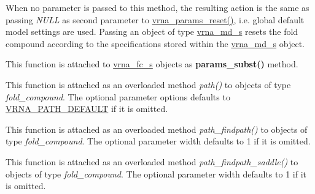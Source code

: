 \begin{DoxyRefList}
When no parameter is passed to this method, the resulting action is the same as passing {\itshape N\+U\+LL} as second parameter to \hyperlink{group__energy__parameters_gac40dc82e48a72a97cfc58b9da08a7792}{vrna\+\_\+params\+\_\+reset()}, i.\+e. global default model settings are used. Passing an object of type \hyperlink{group__model__details_structvrna__md__s}{vrna\+\_\+md\+\_\+s} resets the fold compound according to the specifications stored within the \hyperlink{group__model__details_structvrna__md__s}{vrna\+\_\+md\+\_\+s} object.  
\item[\label{wrappers__wrappers000085}%
\Hypertarget{wrappers__wrappers000085}%
Global \hyperlink{group__energy__parameters_ga5d1909208f7ea3baa98b75afaa1f62ca}{vrna\+\_\+params\+\_\+subst} (vrna\+\_\+fold\+\_\+compound\+\_\+t $\ast$vc, vrna\+\_\+param\+\_\+t $\ast$par)]This function is attached to \hyperlink{group__fold__compound_structvrna__fc__s}{vrna\+\_\+fc\+\_\+s} objects as {\bfseries params\+\_\+subst()} method.  
\item[\label{wrappers__wrappers000099}%
\Hypertarget{wrappers__wrappers000099}%
Global \hyperlink{group__paths_gab6aee4143f8b103518d5cbfe6bfe5eae}{vrna\+\_\+path} (vrna\+\_\+fold\+\_\+compound\+\_\+t $\ast$vc, short $\ast$pt, unsigned int steps, unsigned int options)]This function is attached as an overloaded method {\itshape path()} to objects of type {\itshape fold\+\_\+compound}. The optional parameter {\ttfamily options} defaults to \hyperlink{group__paths_gaf1bb1f8fec8d24e3b821f621b19f77b4}{V\+R\+N\+A\+\_\+\+P\+A\+T\+H\+\_\+\+D\+E\+F\+A\+U\+LT} if it is omitted.  
\item[\label{wrappers__wrappers000071}%
\Hypertarget{wrappers__wrappers000071}%
Global \hyperlink{group__direct__paths_ga4b2283c4142cafd99678495585fcc842}{vrna\+\_\+path\+\_\+findpath} (vrna\+\_\+fold\+\_\+compound\+\_\+t $\ast$vc, const char $\ast$s1, const char $\ast$s2, int width)]This function is attached as an overloaded method {\itshape path\+\_\+findpath()} to objects of type {\itshape fold\+\_\+compound}. The optional parameter {\ttfamily width} defaults to 1 if it is omitted.  
\item[\label{wrappers__wrappers000069}%
\Hypertarget{wrappers__wrappers000069}%
Global \hyperlink{group__direct__paths_gad611574a76593e26021f177e7854b6b4}{vrna\+\_\+path\+\_\+findpath\+\_\+saddle} (vrna\+\_\+fold\+\_\+compound\+\_\+t $\ast$vc, const char $\ast$s1, const char $\ast$s2, int width)]This function is attached as an overloaded method {\itshape path\+\_\+findpath\+\_\+saddle()} to objects of type {\itshape fold\+\_\+compound}. The optional parameter {\ttfamily width} defaults to 1 if it is omitted.  

\end{DoxyRefList}
